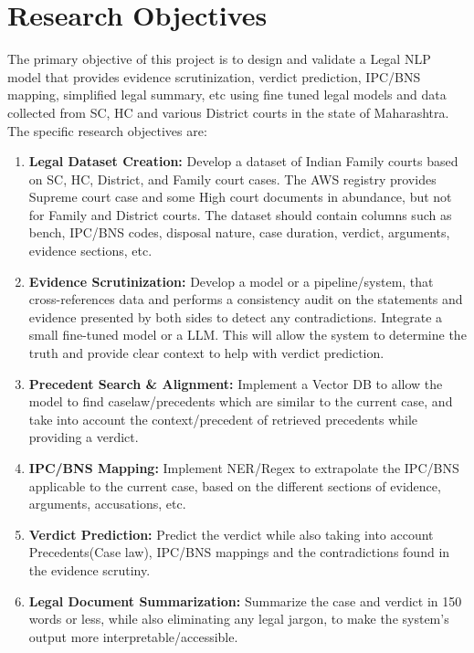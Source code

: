 \pagebreak
\section{Research Objectives}

The primary objective of this project is to design and validate a Legal NLP model that provides evidence scrutinization, verdict prediction, IPC/BNS mapping, simplified legal summary, etc using fine tuned legal models and data collected from SC, HC and various District courts in the state of Maharashtra. The specific research objectives are:

\begin{enumerate}
    \item \textbf{Legal Dataset Creation:} Develop a dataset of Indian Family courts based on SC, HC, District, and Family court cases. The AWS registry provides Supreme court case and some High court documents in abundance, but not for Family and District courts. The dataset should contain columns such as bench, IPC/BNS codes, disposal nature, case duration, verdict, arguments, evidence sections, etc.
    
    \item \textbf{Evidence Scrutinization:} Develop a model or a pipeline/system, that cross-references data and performs a consistency audit on the statements and evidence presented by both sides to detect any contradictions. Integrate a small fine-tuned model or a LLM. This will allow the system to determine the truth and provide clear context to help with verdict prediction.
    
	\item \textbf{Precedent Search \& Alignment:} Implement a Vector DB to allow the model to find caselaw/precedents which are similar to the current case, and take into account the context/precedent of retrieved precedents while providing a verdict.
    
    \item \textbf{IPC/BNS Mapping:} Implement NER/Regex to extrapolate the IPC/BNS applicable to the current case, based on the different sections of evidence, arguments, accusations, etc.
    
    \item \textbf{Verdict Prediction:} Predict the verdict while also taking into account Precedents(Case law), IPC/BNS mappings and the contradictions found in the evidence scrutiny.
    
    \item \textbf{Legal Document Summarization:} Summarize the case and verdict in 150 words or less, while also eliminating any legal jargon, to make the system’s output more interpretable/accessible.
    
\end{enumerate}

